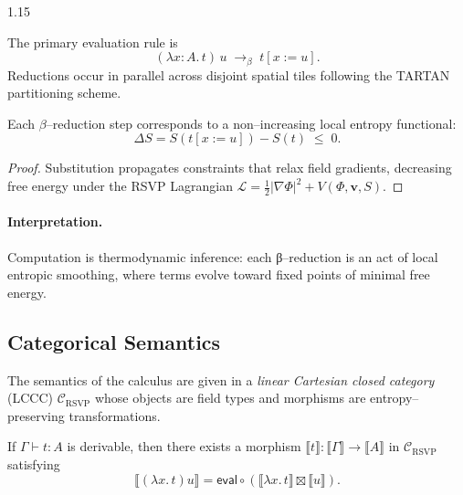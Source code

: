 \documentclass[12pt,a4paper]{article}
\begin{document}
\begin{spacing}{1.15}
\begin{definition}[β--Reduction]
\label{def:beta}
The primary evaluation rule is
\[
  (\lambda x{:}A.\,t)\,u \;\longrightarrow_{\beta}\; t[x:=u].
\]
Reductions occur in parallel across disjoint spatial tiles
following the TARTAN partitioning scheme.
\end{definition}

\begin{proposition}
\label{prop:entropy}
Each $\beta$--reduction step corresponds to a non--increasing
local entropy functional:
\[
  \Delta S = S(t[x:=u]) - S(t) \;\le\; 0.
\]
\end{proposition}

\begin{proof}
Substitution propagates constraints that relax field gradients,
decreasing free energy under the RSVP Lagrangian
$\mathcal{L} = \frac{1}{2}|\nabla\Phi|^2 + V(\Phi,\mathbf{v},S)$.
\end{proof}

\paragraph{Interpretation.}
Computation is thermodynamic inference:
each β–reduction is an act of local entropic smoothing,
where terms evolve toward fixed points of minimal free energy.

\subsection{Categorical Semantics}

\begin{definition}
\label{def:lccc}
The semantics of the calculus are given in a
\emph{linear Cartesian closed category} (LCCC)
$\mathcal{C}_{\mathrm{RSVP}}$
whose objects are field types and morphisms are
entropy--preserving transformations.
\end{definition}

\begin{theorem}[Soundness]
\label{thm:soundness}
If $\Gamma \vdash t : A$ is derivable,
then there exists a morphism
$\llbracket t \rrbracket : \llbracket \Gamma \rrbracket \to \llbracket A \rrbracket$
in $\mathcal{C}_{\mathrm{RSVP}}$ satisfying
\[
  \llbracket (\lambda x.\,t)u \rrbracket
  = \mathsf{eval}\circ
    (\llbracket \lambda x.\,t \rrbracket \boxtimes \llbracket u \rrbracket).
\]
\end{theorem}


\end{spacing}
\end{document}
